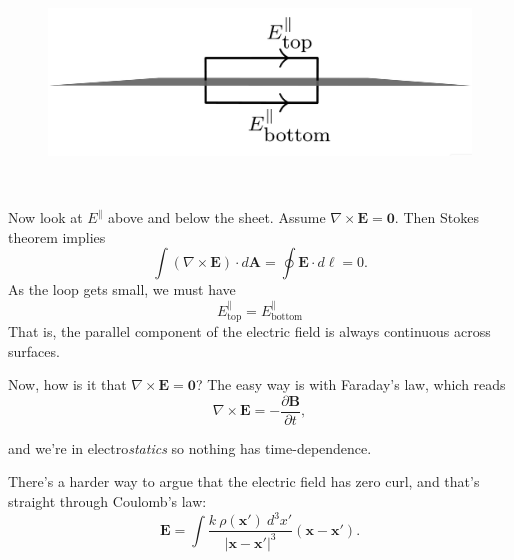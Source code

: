 \documentclass{article}
\begin{document}
\vspace{1em}

\begin{minipage}{0.4\textwidth}
\begin{figure}[H]
\centering
\includegraphics[width=\textwidth]{figures/2l10.png}
\end{figure}
\end{minipage}
~
\begin{minipage}{0.55\textwidth}
Now look at $E^{\parallel}$ above and below the sheet. Assume $\nabla \times \bm{E} = \bm{0}$.
\vspace{1em}
Then Stokes theorem implies 
\begin{equation*}
    \int \left( \nabla \times \bm{E} \right) \cdot d\bm{A} = \oint \bm{E} \cdot d\bm{\ell} = 0.
\end{equation*}
As the loop gets small, we must have
\begin{equation*}
    \boxed{E_{\text{top}}^{\parallel} = E_{\text{bottom}}^{\parallel}}
\end{equation*}
That is, the parallel component of the electric field is always continuous across surfaces.
\end{minipage}

\vspace{1em}

Now, how is it that $\nabla \times \bm{E} = \bm{0}$? The easy way is with Faraday's law, which reads
\begin{equation*}
    \nabla \times \bm{E} = -\frac{\partial \bm{B}}{\partial t},
\end{equation*}

and we're in electro\emph{statics} so nothing has time-dependence.

\vspace{1em}

There's a harder way to argue that the electric field has zero curl, and that's straight through Coulomb's law:
\begin{equation*}
    \bm{E} = \int \frac{k\ \rho(\bm{x'})\ d^3x'}{\left| \bm{x} - \bm{x'} \right|^3} \left( \bm{x} - \bm{x'} \right).
\end{equation*}
\end{document}
